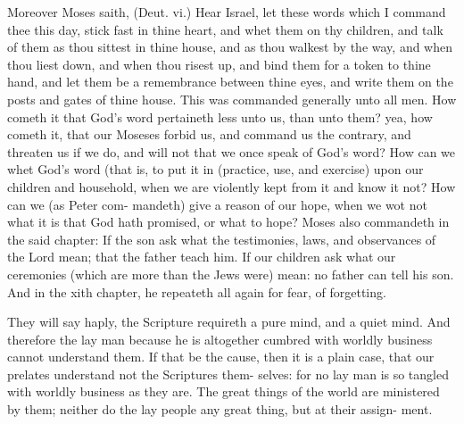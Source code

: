\documentclass{custom}
\begin{document}
Moreover Moses saith, (Deut. vi.) Hear Israel,
let these words which I command thee this day,
stick fast in thine heart, and whet them on thy
children, and talk of them as thou sittest in thine
house, and as thou walkest by the way, and when
thou liest down, and when thou risest up, and
bind them for a token to thine hand, and let 
them be a remembrance between thine eyes, 
and write them on the posts and gates of thine 
house. This was commanded generally unto all 
men. How cometh it that God's word pertaineth
less unto us, than unto them? yea, how cometh 
it, that our Moseses forbid us, and command us 
the contrary, and threaten us if we do, and will 
not that we once speak of God's word? How 
can we whet God's word (that is, to put it in
(practice, use, and exercise) upon our children 
and household, when we are violently kept from 
it and know it not? How can we (as Peter com-
mandeth) give a reason of our hope, when we 
wot not what it is that God hath promised, or 
what to hope? Moses also commandeth in the 
said chapter: If the son ask what the testimonies,
laws, and observances of the Lord mean; that 
the father teach him. If our children ask what 
our ceremonies (which are more than the Jews 
were) mean: no father can tell his son. And in 
the xith chapter, he repeateth all again for fear,
of forgetting.

They will say haply, the Scripture requireth a 
pure mind, and a quiet mind. And therefore 
the lay man because he is altogether cumbred 
with worldly business cannot understand them. 
If that be the cause, then it is a plain case, that 
our prelates understand not the Scriptures them- 
selves: for no lay man is so tangled with worldly 
business as they are. The great things of the 
world are ministered by them; neither do the 
lay people any great thing, but at their assign- 
ment.
\end{document}
